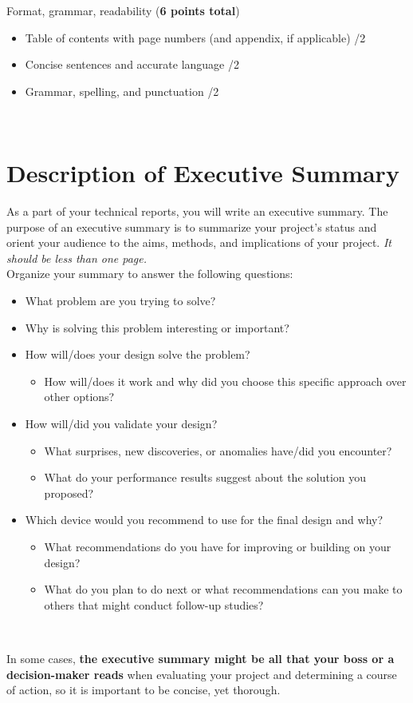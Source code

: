 \documentclass{article}
\begin{document}
Format, grammar, readability (\textbf{6 points total})
\begin{small}
\begin{itemize}
	\item Table of contents with page numbers (and appendix, if applicable) \hfill \underline{\hspace{1cm}}/2
	\item Concise sentences and accurate language \hfill \underline{\hspace{1cm}}/2
	\item Grammar, spelling, and punctuation \hfill \underline{\hspace{1cm}}/2
\end{itemize}
\end{small}\
\pagebreak

\section*{Description of Executive Summary}
As a part of your technical reports, you will write an executive summary. The purpose of an executive summary is to summarize your project’s status and orient your audience to the aims, methods, and implications of your project. \textit{It should be less than one page.}\\

Organize your summary to answer the following questions:
\begin{itemize}
	\item What problem are you trying to solve?
	\item Why is solving this problem interesting or important?
	\item How will/does your design solve the problem?
	\begin{itemize}
		\item How will/does it work and why did you choose this specific approach over other options?
	\end{itemize}
	\item How will/did you validate your design?
	\begin{itemize}
		\item What surprises, new discoveries, or anomalies have/did you encounter?
		\item What do your performance results suggest about the solution you proposed?
	\end{itemize}
	\item Which device would you recommend to use for the final design and why?
	\begin{itemize}
		\item What recommendations do you have for improving or building on your design?
		\item What do you plan to do next or what recommendations can you make to others that might conduct follow-up studies?
	\end{itemize}
\end{itemize}\

In some cases, \textbf{the executive summary might be all that your boss or a decision-maker reads} when evaluating your project and determining a course of action, so it is important to be concise, yet thorough.
\end{document}
